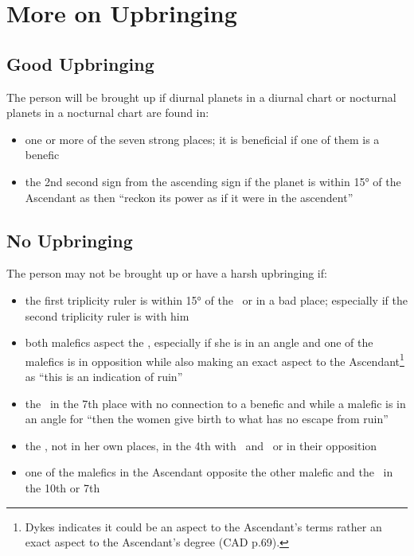 \section{More on Upbringing}

\subsection{Good Upbringing}
\label{sec:upbringing2}
The person will be brought up if diurnal planets in a diurnal chart or nocturnal planets in a nocturnal chart are found in:
\begin{itemize}[topsep=0pt,itemsep=0pt]
\item one or more of the seven strong places; it is beneficial if one of them is a benefic

\item the 2nd second sign from the ascending sign if the planet is within 15° of the Ascendant as then ``reckon its power as if it were in the ascendent''
\end{itemize}

\subsection{No Upbringing}
The person may not be brought up or have a harsh upbringing if:
\begin{itemize}[topsep=0pt,itemsep=0pt]
\item the first triplicity ruler is within 15° of the \Sun\, or in a bad place; especially if the second triplicity ruler is with him

\item both malefics aspect the \Moon, especially if she is in an angle and one of the malefics is in opposition while also making an exact aspect to the Ascendant\footnote{Dykes indicates it could be an aspect to the Ascendant's terms rather an exact aspect to the Ascendant's degree (CAD p.69).} as ``this is an indication of ruin''

\item the \Moon\, in the 7th place with no connection to a benefic and while a malefic is in an angle for ``then the women give birth to what has no escape from ruin''

\item the \Moon, not in her own places, in the 4th with \Saturn\, and \Mars\, or in their opposition

\item one of the malefics in the Ascendant opposite the other malefic and the \Moon\, in the 10th or 7th

\end{itemize}

